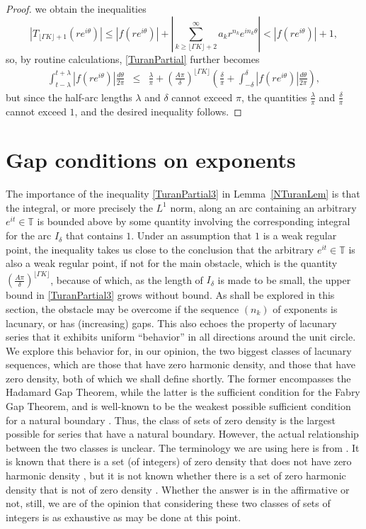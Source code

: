 \documentclass[11pt,a4paper]{article}
\newcommand{\T}{\mathbb{T}}
\def\lpar{\left(}
\def\rpar{\right)}
\begin{document}
\begin{proof}
we obtain the inequalities
\[|T_{\lfloor \Gamma K\rfloor+1}(re^{i\theta})|\leq \left|f(re^{i\theta})\right|+\left|\sum_{k\geq \lfloor\Gamma K\rfloor +2}^\infty a_kr^{n_k}e^{in_k\theta}\right|< \left|f(re^{i\theta})\right|+1,
\]
so, by routine calculations, \eqref{TuranPartial} further becomes 
\begin{eqnarray}
    \int_{t-\lambda}^{t+\lambda}\left|f(re^{i\theta})\right|\frac{d\theta}{2\pi} &\leq&\frac{\lambda}{\pi}+\left(\frac{A\pi}{\delta}\right)^{\lfloor\Gamma K\rfloor}\lpar\frac{\delta}{\pi}+\int_{-\delta}^{\delta} \left|f(re^{i\theta})\right| \frac{d\theta}{2\pi}\rpar,\nonumber
\end{eqnarray}
but since the half-arc lengths $\lambda$ and $\delta$ cannot exceed $\pi$, the quantities $\frac{\lambda}{\pi}$ and $\frac{\delta}{\pi}$ cannot exceed $1$, and the desired inequality follows.
\end{proof}

\section{Gap conditions on exponents}\label{GapSec}

The importance of the inequality \eqref{TuranPartial3} in Lemma~\ref{NTuranLem} is that the integral, or more precisely the $L^1$ norm, along an arc containing an arbitrary $e^{it}\in\T$ is bounded above by some quantity involving the corresponding integral for the arc $I_\delta$ that contains $1$. Under an assumption that $1$ is a weak regular point, the inequality takes us close to the conclusion that the arbitrary $e^{it}\in\T$ is also a weak regular point, if not for the main obstacle, which is the quantity $\left(\frac{A\pi}{\delta}\right)^{\lfloor\Gamma K\rfloor}$, because of which, as the length of $I_\delta$ is made to be small, the upper bound in \eqref{TuranPartial3} grows without bound. As shall be explored in this section, the obstacle may be overcome if the sequence $(n_k)$ of exponents is lacunary, or has (increasing) gaps. This also echoes the property of lacunary series that it exhibits uniform ``behavior'' in all directions around the unit circle. We explore this behavior for, in our opinion, the two biggest classes of lacunary sequences, which are those that have zero harmonic density, and those that have zero density, both of which we shall define shortly. The former encompasses the Hadamard Gap Theorem, while the latter is the sufficient condition for the Fabry Gap Theorem, and is well-known to be the weakest possible sufficient condition for a natural boundary \cite[p.~102]{erd45}. Thus, the class of sets of zero density is the largest possible for series that have a natural boundary. However, the actual relationship between the two classes is unclear. The terminology we are using here is from \cite[Chapter~10]{gra13}. It is known that there is a set (of integers) of zero density that does not have zero harmonic density \cite[p.~186]{gra13}, but it is not known whether there is a set of zero harmonic density that is not of zero density \cite[Open Problem~13, p.~249]{gra13}. Whether the answer is in the affirmative or not, still, we are of the opinion that considering these two classes of sets of integers is as exhaustive as may be done at this point.
\end{document}
